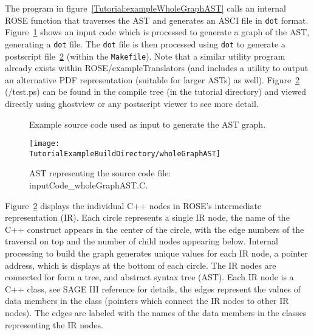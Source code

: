 The program in figure~\ref{Tutorial:exampleWholeGraphAST} calls 
an internal ROSE function that traverses the AST and generates 
an ASCI file in {\tt dot} format.
Figure~\ref{Tutorial:exampleInputCode_WholeGraphAST} shows an input
code which is processed to generate a graph of the AST, generating a 
{\tt dot} file.   The {\tt dot} file is then processed
using {\tt dot} to generate a postscript file~\ref{tutorial:exampleOutputWholeGraphAST}
(within the {\tt Makefile}).
Note that a similar utility program already exists within ROSE/exampleTranslators
(and includes a utility to output an alternative PDF representation 
(suitable for larger ASTs) as well).  Figure~\ref{tutorial:exampleOutputWholeGraphAST}
(\TutorialExampleBuildDirectory/test.ps) can be found in the compile 
tree (in the tutorial directory) and viewed directly using ghostview 
or any postscript viewer to see more detail.


\begin{figure}[!h]
{\indent
{\mySmallFontSize

\begin{latexonly}
   
\end{latexonly}

\begin{htmlonly}
   
\end{htmlonly}

}
}
\caption{Example source code used as input to generate the AST graph.}
\label{Tutorial:exampleInputCode_WholeGraphAST}
\end{figure}

\begin{figure}
\texttt{[image: \\TutorialExampleBuildDirectory/wholeGraphAST]}
\caption{AST representing the source code file: inputCode\_wholeGraphAST.C.}
\label{tutorial:exampleOutputWholeGraphAST}
\end{figure}

   Figure~\ref{tutorial:exampleOutputWholeGraphAST} displays the individual
C++ nodes in ROSE's intermediate representation (IR).  Each circle represents
a single IR node, the name of the C++ construct appears in the center of the
circle, with the edge numbers of the traversal on top and the number of
child nodes appearing below.  Internal processing to build the graph generates
unique values for each IR node, a pointer address, which is displays at the bottom
of each circle.  The IR nodes are connected for form a tree, and abstract syntax
tree (AST). Each IR node is a C++ class, see SAGE III reference for details,
the edges represent the values of data members in the class (pointers which connect
the IR nodes to other IR nodes).  The edges are labeled with the names of the 
data members in the classes representing the IR nodes.


